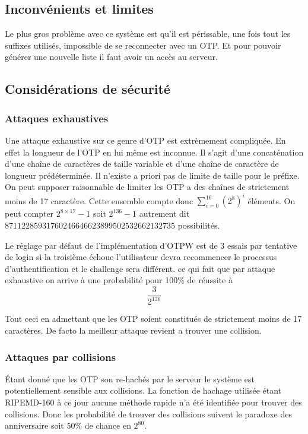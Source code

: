 \documentclass{../res/univ-projet}
\begin{document}
\subsection{Inconvénients et limites}
        Le plus gros problème avec ce système est qu'il est périssable, une fois tout les
    suffixes utilisés, impossible de se reconnecter avec un OTP. Et pour pouvoir générer
    une nouvelle liste il faut avoir un accès au serveur.

\subsection{Considérations de sécurité}
\subsubsection{Attaques exhaustives} %
        Une attaque exhaustive sur ce genre d'OTP est extrèmement compliquée.
    En effet la longueur de l'OTP en lui même est inconnue. Il s'agit d'une
    concaténation d'une chaîne de caractères de taille variable et d'une chaîne
    de caractère de longueur prédéterminée. Il n'existe a priori pas de limite
    de taille pour le préfixe. On peut supposer raisonnable de limiter les
    OTP a des chaînes de strictement moins de 17 caractère.
    Cette ensemble compte donc $\sum_{i=0}^{16}(2^8)^i$ éléments.
    On peut compter  $2^{8\times 17} - 1$ soit $2^136 -1$ autrement dit
    $87112285931760246646623899502532662132735$ possibilités.

        Le réglage par défaut de l'implémentation d'OTPW est de 3 essais par tentative de login
    si la troisième échoue l'utilisateur devra recommencer le processus d'authentification
    et le challenge sera différent. ce qui fait que par attaque exhaustive on arrive à
    une probabilité pour 100\% de réussite à
    \[\frac{3}{2^{136}}\]

        Tout ceci en admettant que les OTP soient constitués de strictement moins
    de 17 caractères. De facto la meilleur attaque revient a trouver une collision.

\subsubsection{Attaques par collisions}
        Étant donné que les OTP son re-hachés par le serveur le système est potentiellement sensible
    aux collisions. La fonction de hachage utilisée étant RIPEMD-160 à ce jour aucune méthode rapide
    n'a été identifiée pour trouver des collisions. Donc les probabilité de trouver des collisions
    suivent le paradoxe des anniversaire soit 50\% de chance en $2^80$.
\end{document}
